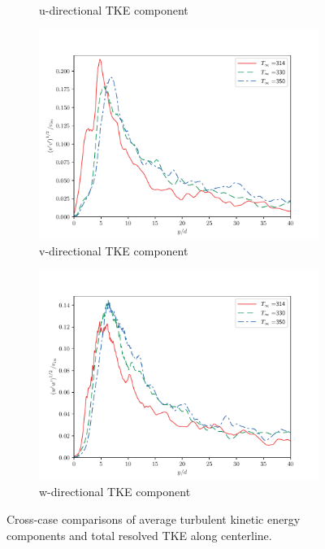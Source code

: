\begin{figure}[H]
\begin{center}
\begin{subfigure}{0.45\textwidth}
	\caption{u-directional TKE component} \label{u_fa_1}
\end{subfigure}
\vfill
\begin{subfigure}{0.45\textwidth}
	\includegraphics[scale=.45]{figures/Plots/centerline/v_fa_centerline.pdf}
	\caption{v-directional TKE component} \label{v_fa_1}
\end{subfigure}
\begin{subfigure}{0.45\textwidth}
	\includegraphics[scale=.45]{figures/Plots/centerline/w_fa_centerline.pdf}
	\caption{w-directional TKE component} \label{w_fa_1}
\end{subfigure}
\caption{Cross-case comparisons of average turbulent kinetic energy components and total resolved TKE along centerline.}
\label{noniso_TKE_features}
\end{center}
\end{figure}

